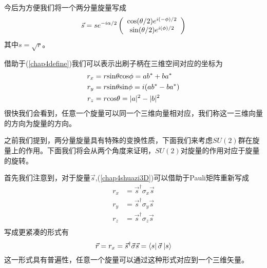 今后为方便我们将一个两分量旋量写成
\begin{equation}
    \vec{s}=se^{-i\alpha/2}\left(\begin{array}{c}
         {\rm cos}(\theta/2)e^{i(-\phi)/2}  \\
          {\rm sin}(\theta/2)e^{i(\phi)/2}
    \end{array}\right)
\end{equation}
其中$s=\sqrt{r}$。

借助于(\ref{chap4define})我们可以表示出刷子柄在三维空间对应的坐标为
\begin{equation}
\label{chap4shuazi3D}
    \begin{aligned}
        r_{x}&=r{\rm sin}\theta{\rm cos}\phi=ab^{*}+ba^{*} \\ 
        r_{y}&=r{\rm sin}\theta{\rm sin}\phi=i(ab^{*}-ba^{*}) \\ 
        r_{z}&=r{\rm cos}\theta=|a|^{2}-|b|^{2} \\ 
    \end{aligned}
\end{equation}
很快我们会看到，任意一个旋量可以同一个三维向量相对应，我们称这一三维向量的方向为旋量的方向。

之前我们提到，两分量旋量具有特殊的变换性质，下面我们来考虑$SU(2)$群在旋量上的作用。下面我们将会从两个角度来证明，$SU(2)$对旋量的作用对应于旋量的旋转。

首先我们注意到，对于旋量$\vec{s}$,(\ref{chap4shuazi3D})可以借助于Pauli矩阵重新写成
\begin{equation}
\label{chap4shuazi3DPauli}
    \begin{aligned}
        r_{x}&=\vec{s}^{\dagger}\sigma_{x}\vec{s} \\ 
       r_{y}&=\vec{s}^{\dagger}\sigma_{y}\vec{s}  \\ 
        r_{z}&=\vec{s}^{\dagger}\sigma_{z}\vec{s}  \\ 
    \end{aligned}
\end{equation}
写成更紧凑的形式有
\begin{equation}
\label{chap4shuazi3Dpaulicompact}
    \vec{r}=r_{x}=\vec{s}^{\dagger}\vec{\sigma}\vec{s}=\bra{s}\vec{\sigma}\ket{s} 
\end{equation}
这一形式具有普遍性，任意一个旋量可以通过这种形式对应到一个三维矢量。

